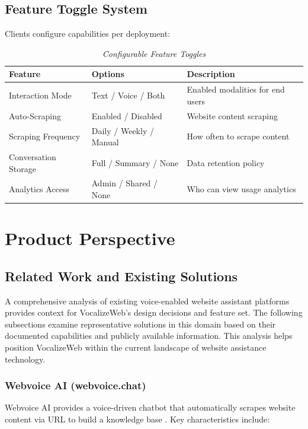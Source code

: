\subsection{Feature Toggle System}

Clients configure capabilities per deployment:

\begin{table}[H]
\centering
\caption{\textit{Configurable Feature Toggles}}
\begin{tabularx}{\textwidth}{|l|l|X|}
\hline
\textbf{Feature} & \textbf{Options} & \textbf{Description} \\
\hline
Interaction Mode & Text / Voice / Both & Enabled modalities for end users \\
\hline
Auto-Scraping & Enabled / Disabled & Website content scraping \\
\hline
Scraping Frequency & Daily / Weekly / Manual & How often to scrape content \\
\hline
Conversation Storage & Full / Summary / None & Data retention policy \\
\hline
Analytics Access & Admin / Shared / None & Who can view usage analytics \\
\hline
\end{tabularx}
\end{table}

\section{Product Perspective}

\subsection{Related Work and Existing Solutions}

A comprehensive analysis of existing voice-enabled website assistant platforms provides context for VocalizeWeb's design decisions and feature set. The following subsections examine representative solutions in this domain based on their documented capabilities and publicly available information. This analysis helps position VocalizeWeb within the current landscape of website assistance technology.

\subsubsection{Webvoice AI (webvoice.chat)}

Webvoice AI provides a voice-driven chatbot that automatically scrapes website content via URL to build a knowledge base \cite{webvoice}. Key characteristics include:

